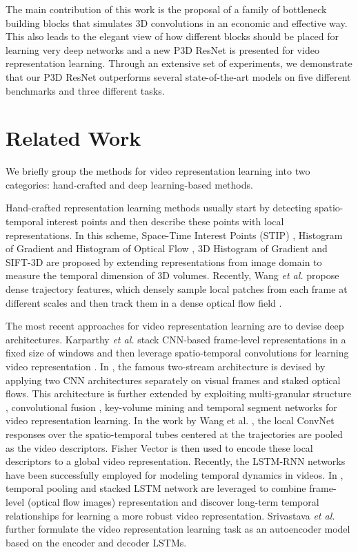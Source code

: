 \documentclass[10pt,twocolumn,letterpaper]{article}
\begin{document}
The main contribution of this work is the proposal of a family of bottleneck building blocks that simulates 3D convolutions in an economic and effective way. This also leads to the elegant view of how different blocks should be placed for learning very deep networks and a new P3D ResNet is presented for video representation learning. Through an extensive set of experiments, we demonstrate that our P3D ResNet outperforms several state-of-the-art models on five different benchmarks and three different tasks.




\section{Related Work}
We briefly group the methods for video representation learning into two categories: hand-crafted and deep learning-based methods.

Hand-crafted representation learning methods usually start by detecting spatio-temporal interest points and then describe these points with local representations. In this scheme, Space-Time Interest Points (STIP) \cite{laptev2005space}, Histogram of Gradient and Histogram of Optical Flow \cite{laptev2008learning}, 3D Histogram of Gradient \cite{klaser2008spatio} and SIFT-3D \cite{scovanner20073} are proposed by extending representations from image domain to measure the temporal dimension of 3D volumes. Recently, Wang \emph{et al.} propose dense trajectory features, which densely sample local patches from each frame at different scales and then track them in a dense optical flow field \cite{wang2013action}.

The most recent approaches for video representation learning are to devise deep architectures. Karparthy \emph{et al.} stack CNN-based frame-level representations in a fixed size of windows and then leverage spatio-temporal convolutions for learning video representation \cite{karpathy2014large}. In \cite{simonyan2014two}, the famous two-stream architecture is devised by applying two CNN architectures separately on visual frames and staked optical flows. This architecture is further extended by exploiting multi-granular structure \cite{li2016action,li2017learning,qiu2015msr}, convolutional fusion \cite{feichtenhofer2016convolutional}, key-volume mining \cite{zhu2016key} and temporal segment networks \cite{wang2016temporal} for video representation learning. In the work by Wang et al. \cite{wang2015action}, the local ConvNet responses over the spatio-temporal tubes centered at the trajectories are pooled as the video descriptors. Fisher Vector \cite{perronnin2010improving} is then used to encode these local descriptors to a global video representation.
Recently, the LSTM-RNN networks have been successfully employed for modeling temporal dynamics in videos. In \cite{jiang2017exploiting,yue2015beyond}, temporal pooling and stacked LSTM network are leveraged to combine frame-level (optical flow images) representation and discover long-term temporal relationships for learning a more robust video representation. Srivastava \emph{et al.} \cite{srivastava2015unsupervised} further formulate the video representation learning task as an autoencoder model based on the encoder and decoder LSTMs.
\end{document}

